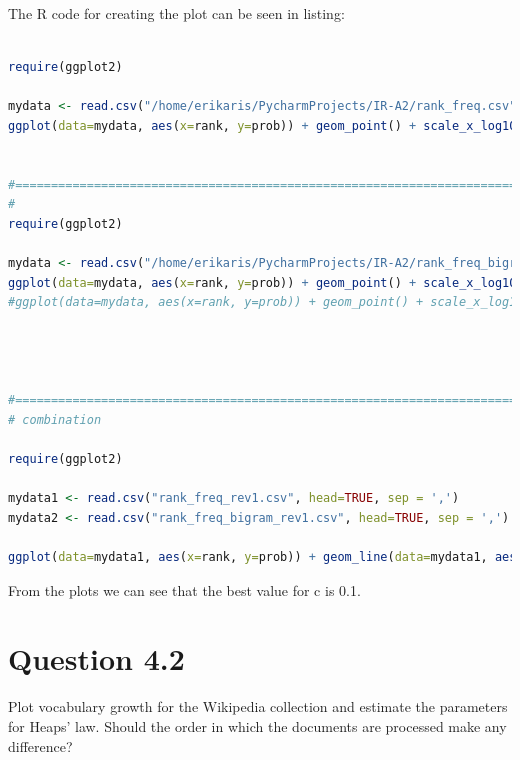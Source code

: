 \documentclass[letterpaper,11pt]{article}
\begin{document}
The R code for creating the plot can be seen in listing: 
\begin{lstlisting}[language=R, caption={Code for plotting vocabulary growth and calculating the Heap's parameter}, label={lst:heap-par}]

require(ggplot2)

mydata <- read.csv("/home/erikaris/PycharmProjects/IR-A2/rank_freq.csv", head=TRUE, sep = ',')
ggplot(data=mydata, aes(x=rank, y=prob)) + geom_point() + scale_x_log10() + scale_y_log10()


#=======================================================================
# 
require(ggplot2)

mydata <- read.csv("/home/erikaris/PycharmProjects/IR-A2/rank_freq_bigram.csv", head=TRUE, sep = ',')
ggplot(data=mydata, aes(x=rank, y=prob)) + geom_point() + scale_x_log10() + scale_y_log10()
#ggplot(data=mydata, aes(x=rank, y=prob)) + geom_point() + scale_x_log10() + scale_y_log10()




#=======================================================================
# combination

require(ggplot2)

mydata1 <- read.csv("rank_freq_rev1.csv", head=TRUE, sep = ',')
mydata2 <- read.csv("rank_freq_bigram_rev1.csv", head=TRUE, sep = ',')

ggplot(data=mydata1, aes(x=rank, y=prob)) + geom_line(data=mydata1, aes(x=rank, y=prob, color="Words")) + geom_line(data=mydata2, aes(x=rank, y=prob, color="Bigram")) + scale_colour_manual(name='', values=c('Words'='#000099', 'Bigram'='#CC0000'), guide='legend') + scale_x_log10() + scale_y_log10() + labs(title='Log-log plot for rank and frequency of words and bigram',x = 'Words in Collection', y = 'Words in Vocabulary')


\end{lstlisting}

From the plots we can see that the best value for c is 0.1.

\noindent\makebox[\linewidth]{\rule{\textwidth}{0.4pt}}


\section*{Question 4.2}
\begin{spverbatim}
Plot vocabulary growth for the Wikipedia collection and estimate the parameters for Heaps’ law. Should the order in which the documents are processed make any difference?
\end{spverbatim}
\end{document}
